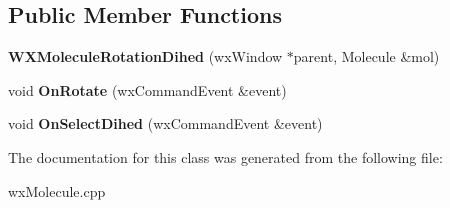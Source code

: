 \subsection*{Public Member Functions}
\begin{DoxyCompactItemize}
\item 
\mbox{\label{class_obj_cryst_1_1_w_x_molecule_rotation_dihed_a2704c305a16f6ca4d0c781d0fb484ca3}} 
{\bfseries W\+X\+Molecule\+Rotation\+Dihed} (wx\+Window $\ast$parent, Molecule \&mol)
\item 
\mbox{\label{class_obj_cryst_1_1_w_x_molecule_rotation_dihed_aa5a92f0bf55f439ce8a3c97f979f7fd3}} 
void {\bfseries On\+Rotate} (wx\+Command\+Event \&event)
\item 
\mbox{\label{class_obj_cryst_1_1_w_x_molecule_rotation_dihed_a664bd2bd39c6dd215732bf0424483abb}} 
void {\bfseries On\+Select\+Dihed} (wx\+Command\+Event \&event)
\end{DoxyCompactItemize}


The documentation for this class was generated from the following file\+:\begin{DoxyCompactItemize}
\item 
wx\+Molecule.\+cpp\end{DoxyCompactItemize}
